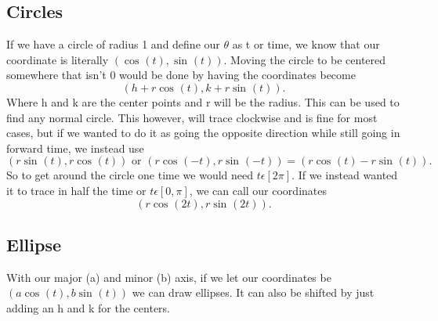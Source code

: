 \subsection{Circles}%
\label{sub:Circles}
If we have a circle of radius 1 and define our $ \theta $ as t or time, we know that our coordinate is literally $ \left( \cos^{  } \left( t \right) ,\sin^{  } \left( t \right)  \right)  $. Moving the circle to be centered somewhere that isn't 0 would be done by having the coordinates become
\[
\left( h+r\cos^{  } \left( t \right) ,k+r\sin^{  } \left( t \right)  \right)
.\] 
Where h and k are the center points and r will be the radius. This can be used to find any normal circle. This however, will trace clockwise and is fine for most cases, but if we wanted to do it as going the opposite direction while still going in forward time, we instead use 
\[
	\left( r\sin^{  } \left( t \right) , r\cos^{  } \left( t \right)  \right) \text{ or }\left( r\cos^{  } \left( -t \right) ,r\sin^{  } \left( -t \right)  \right) = \left( r\cos^{  } \left( t \right) -r\sin^{  } \left( t \right)  \right) 
.\] 
So to get around the circle one time we would need $ t\epsilon\left[ 2\pi \right]  $. If we instead wanted it to trace in half the time or $ t\epsilon\left[ 0,\pi  \right]  $, we can call our coordinates
\[
	\left( r\cos^{  } \left( 2t \right) ,r\sin^{  } \left( 2t \right)  \right) 
.\] 
\subsection{Ellipse}%
\label{sub:Ellipse}
With our major (a) and minor (b) axis, if we let our coordinates be $ \left( a\cos^{  } \left( t \right) , b\sin^{  } \left( t \right)  \right)  $ we can draw ellipses. It can also be shifted by just adding an h and k for the centers. 

